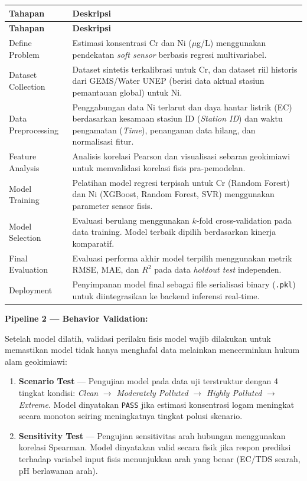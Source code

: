 \documentclass[12pt,a4paper]{article}
\begin{document}
\begin{longtable}{|p{4.2cm}|p{8.3cm}|}
\hline
\textbf{Tahapan} & \textbf{Deskripsi} \\
\hline
\endfirsthead
\hline
\textbf{Tahapan} & \textbf{Deskripsi} \\
\hline
\endhead
Define Problem & Estimasi konsentrasi Cr dan Ni ($\mu$g/L) menggunakan pendekatan \textit{soft sensor} berbasis regresi multivariabel. \\
\hline
Dataset Collection & Dataset sintetis terkalibrasi untuk Cr, dan dataset riil historis dari GEMS/Water UNEP (berisi data aktual stasiun pemantauan global) untuk Ni. \\
\hline
Data Preprocessing & Penggabungan data Ni terlarut dan daya hantar listrik (EC) berdasarkan kesamaan stasiun ID (\textit{Station ID}) dan waktu pengamatan (\textit{Time}), penanganan data hilang, dan normalisasi fitur. \\
\hline
Feature Analysis & Analisis korelasi Pearson dan visualisasi sebaran geokimiawi untuk memvalidasi korelasi fisis pra-pemodelan. \\
\hline
Model Training & Pelatihan model regresi terpisah untuk Cr (Random Forest) dan Ni (XGBoost, Random Forest, SVR) menggunakan parameter sensor fisis. \\
\hline
Model Selection & Evaluasi berulang menggunakan $k$-fold cross-validation pada data training. Model terbaik dipilih berdasarkan kinerja komparatif. \\
\hline
Final Evaluation & Evaluasi performa akhir model terpilih menggunakan metrik RMSE, MAE, dan $R^2$ pada data \textit{holdout test} independen. \\
\hline
Deployment & Penyimpanan model final sebagai file serialisasi binary (\texttt{.pkl}) untuk diintegrasikan ke backend inferensi real-time. \\
\hline
\end{longtable}

\textbf{Pipeline 2 --- Behavior Validation:}

Setelah model dilatih, validasi perilaku fisis model wajib dilakukan untuk memastikan model tidak hanya menghafal data melainkan mencerminkan hukum alam geokimiawi:

\begin{enumerate}
    \item \textbf{Scenario Test} --- Pengujian model pada data uji terstruktur dengan 4 tingkat kondisi: \textit{Clean} $\rightarrow$ \textit{Moderately Polluted} $\rightarrow$ \textit{Highly Polluted} $\rightarrow$ \textit{Extreme}. Model dinyatakan \texttt{PASS} jika estimasi konsentrasi logam meningkat secara monoton seiring meningkatnya tingkat polusi skenario.
    \item \textbf{Sensitivity Test} --- Pengujian sensitivitas arah hubungan menggunakan korelasi Spearman. Model dinyatakan valid secara fisik jika respon prediksi terhadap variabel input fisis menunjukkan arah yang benar (EC/TDS searah, pH berlawanan arah).
\end{enumerate}
\end{document}
